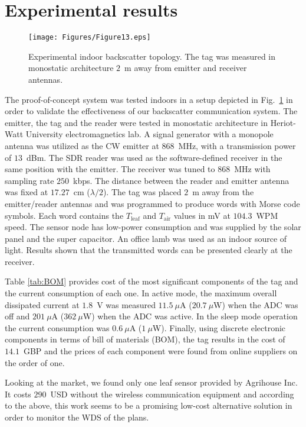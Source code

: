 \documentclass[journal]{IEEEtran}
\begin{document}
\section{Experimental results}
\label{sec:exp}
%
\begin{figure}[t]
\centering
\texttt{[image: Figures/Figure13.eps]}
\caption{Experimental indoor backscatter topology. The tag was measured in monostatic architecture $2$~m away from  emitter and  receiver antennas.}
\label{fig:indoor}
\end{figure}
%
The proof-of-concept system was tested indoors 
in a setup depicted in  Fig.~\ref{fig:indoor} in order to validate the effectiveness of our  backscatter communication system.
%
The emitter, the tag and the reader were tested in  monostatic  architecture  in Heriot-Watt University electromagnetics lab.
%
A signal generator with a monopole antenna  was utilized as the CW emitter at $868$~MHz, with a transmission power of
$13$~dBm.
%
The SDR reader  was used as the software-defined
receiver in the same  position with the emitter.
%
The receiver was tuned to $868$~MHz  with sampling rate $250$~kbps. 
%
The distance between the reader and  emitter antenna was fixed at $17.27$~cm ($\lambda/2$).
%
The tag was placed $2$~m away from the emitter/reader antennas and was programmed to produce  words with Morse code symbols. 
%
Each word contains   the  $T_\text{leaf}$ and $T_\text{air}$ values in mV at $104.3$~WPM speed.
%
The sensor node has low-power consumption and was supplied by the solar panel  and the super capacitor.
%
An office lamb was used  as an  indoor source of light.
%
Results shown that the transmitted words can be presented clearly at the receiver.  






Table \ref{tab:BOM} provides cost of the most significant components of the tag  and the current consumption of each one.
%
In active mode,  the maximum  overall dissipated  current  at $1.8$~V was measured $11.5~\mu$A ($20.7~\mu$W) when the ADC was  off and $201~\mu$A  ($362~\mu$W) when the ADC was active.
%
In the sleep mode operation the current consumption was $0.6~\mu$A ($1~\mu$W). 
%
Finally, using discrete  electronic components in terms of bill of materials (BOM), the tag results in the cost  of $14.1$~GBP
 and
the prices of each component were found from online suppliers on the order of one. 
% 

Looking at the market, we found only one leaf sensor provided by Agrihouse Inc.  
%
It costs $290$~USD without the wireless communication equipment  and according to the above, this work seems to be a promising  low-cost alternative solution in order to monitor the WDS of the plans.
%
%
\end{document}
